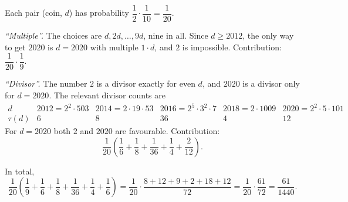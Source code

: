 Each pair (coin, $d$) has probability $\dfrac12\cdot\dfrac1{10}=\dfrac1{20}$.

\emph{``Multiple''.} The choices are $d,2d,\dots,9d$, nine in all. Since $d\ge2012$, the only way to get $2020$ is $d=2020$ with multiple $1\cdot d$, and $2$ is impossible. Contribution: $\dfrac1{20}\cdot\dfrac19$.

\emph{``Divisor''.} The number $2$ is a divisor exactly for even $d$, and $2020$ is a divisor only for $d=2020$. The relevant divisor counts are
\[\begin{array}{c|ccccc}
d&2012=2^2\cdot503&2014=2\cdot19\cdot53&2016=2^5\cdot3^2\cdot7&2018=2\cdot1009&2020=2^2\cdot5\cdot101\\\hline
\tau(d)&6&8&36&4&12
\end{array}\]
For $d=2020$ both $2$ and $2020$ are favourable. Contribution:
\[\dfrac1{20}\left(\dfrac16+\dfrac18+\dfrac1{36}+\dfrac14+\dfrac2{12}\right).\]

In total,
\[\dfrac1{20}\left(\dfrac19+\dfrac16+\dfrac18+\dfrac1{36}+\dfrac14+\dfrac16\right)=\dfrac1{20}\cdot\dfrac{8+12+9+2+18+12}{72}=\dfrac{1}{20}\cdot\dfrac{61}{72}=\boxed{\dfrac{61}{1440}}.\]
